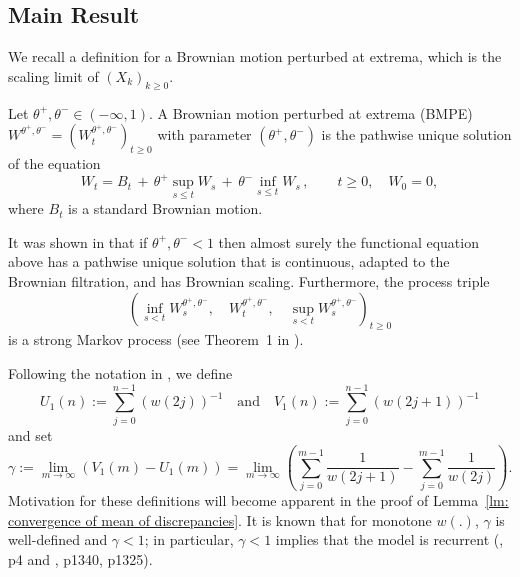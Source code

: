 \documentclass[EJP]{ejpecp} %
\begin{document}



\subsection{Main Result}
We recall a definition for a Brownian motion perturbed at extrema, which is the scaling limit of $(X_k)_{k\geq 0}$.
\begin{definition}
	\label{defn:BMPE}
	Let $\theta^+, \theta^- \in (- \infty , 1)$. A Brownian motion perturbed at
	extrema (BMPE) $W^{\theta^+, \theta^-} = \left(W^{\theta^+, \theta^-}_t\right)_{t\geq 0}$ with parameter $(\theta^+, \theta^-)$ is the pathwise unique solution of the equation
	\[
	W_t = B_t \,+\, \theta^+ \sup_{s\leq t} W_s  \,+\, \theta^- \inf_{s\leq t} W_s \,,   \qquad t \ge 0, \quad W_0 = 0,
	\]
	where $B_t$ is a standard Brownian motion.
\end{definition}
It was shown in \cite{PW97, CD99} that if $\theta^+, \theta^- < 1$ then almost surely the functional equation above has a pathwise unique solution that is continuous, adapted to the Brownian filtration, and has Brownian scaling. 
Furthermore, the process triple 
\[
	\left(\inf_{s < t} W^{\theta^{+}, \theta^{-}}_s\!, \quad
	W^{\theta^{+}, \theta^{-}}_t\!, \quad
	\sup _{s<t} W^{\theta^{+}, \theta^{-}}_s\right)_{t \geq 0}
\]
is a strong Markov process (see Theorem~1 in \cite{PW97}).

Following the notation in \cite{T96}, we define
\[
U_1(n):=\sum_{j=0}^{n-1}(w(2 j))^{-1} \quad \text{and} \quad
V_1(n):=\sum_{j=0}^{n-1}(w(2 j+1))^{-1}
\]
and set
\begin{equation}
	\label{eq: gamma}
	\gamma:= \lim_{m\to \infty}\left( V_1(m) - U_1(m) \right) =\lim_{m\to \infty} \left( \sum_{j=0}^{m-1} \frac{1}{ w(2j+1)}-  \sum_{j=0}^{m-1}  \frac{1}{w(2j)} \right) 
	.\end{equation}
Motivation for these definitions will become apparent in the proof of Lemma~\ref{lm: convergence of mean of discrepancies}.
It is known that for monotone $w(.)$, $\gamma$
is well-defined and ${\gamma<1}$; in particular, $\gamma<1$ implies that the model is recurrent (\cite{KMP23}, p4 and \cite{T96}, p1340, p1325). 
 
\end{document}
